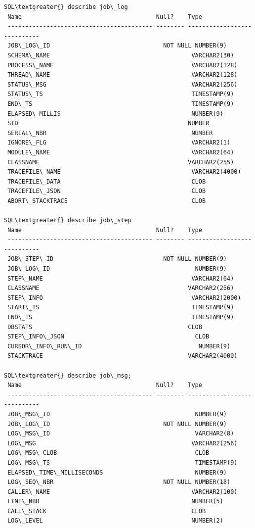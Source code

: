 \documentclass[letterpaper,10pt,english]{sphinxmanual}
\begin{document}
\begin{Verbatim}[commandchars=\\\{\}]
SQL\textgreater{} describe job\_log
 Name                                      Null?    Type
 ----------------------------------------- -------- ----------------------------
 JOB\_LOG\_ID                                NOT NULL NUMBER(9)
 SCHEMA\_NAME                                        VARCHAR2(30)
 PROCESS\_NAME                                       VARCHAR2(128)
 THREAD\_NAME                                        VARCHAR2(128)
 STATUS\_MSG                                         VARCHAR2(256)
 STATUS\_TS                                          TIMESTAMP(9)
 END\_TS                                             TIMESTAMP(9)
 ELAPSED\_MILLIS                                     NUMBER(9)
 SID                                                NUMBER
 SERIAL\_NBR                                         NUMBER
 IGNORE\_FLG                                         VARCHAR2(1)
 MODULE\_NAME                                        VARCHAR2(64)
 CLASSNAME                                          VARCHAR2(255)
 TRACEFILE\_NAME                                     VARCHAR2(4000)
 TRACEFILE\_DATA                                     CLOB
 TRACEFILE\_JSON                                     CLOB
 ABORT\_STACKTRACE                                   CLOB

SQL\textgreater{} describe job\_step
 Name                                      Null?    Type
 ----------------------------------------- -------- ----------------------------
 JOB\_STEP\_ID                               NOT NULL NUMBER(9)
 JOB\_LOG\_ID                                         NUMBER(9)
 STEP\_NAME                                          VARCHAR2(64)
 CLASSNAME                                          VARCHAR2(256)
 STEP\_INFO                                          VARCHAR2(2000)
 START\_TS                                           TIMESTAMP(9)
 END\_TS                                             TIMESTAMP(9)
 DBSTATS                                            CLOB
 STEP\_INFO\_JSON                                     CLOB
 CURSOR\_INFO\_RUN\_ID                                 NUMBER(9)
 STACKTRACE                                         VARCHAR2(4000)

SQL\textgreater{} describe job\_msg;
 Name                                      Null?    Type
 ----------------------------------------- -------- ----------------------------
 JOB\_MSG\_ID                                         NUMBER(9)
 JOB\_LOG\_ID                                NOT NULL NUMBER(9)
 LOG\_MSG\_ID                                         VARCHAR2(8)
 LOG\_MSG                                            VARCHAR2(256)
 LOG\_MSG\_CLOB                                       CLOB
 LOG\_MSG\_TS                                         TIMESTAMP(9)
 ELAPSED\_TIME\_MILLISECONDS                          NUMBER(9)
 LOG\_SEQ\_NBR                               NOT NULL NUMBER(18)
 CALLER\_NAME                                        VARCHAR2(100)
 LINE\_NBR                                           NUMBER(5)
 CALL\_STACK                                         CLOB
 LOG\_LEVEL                                          NUMBER(2)
\end{Verbatim}
\end{document}
